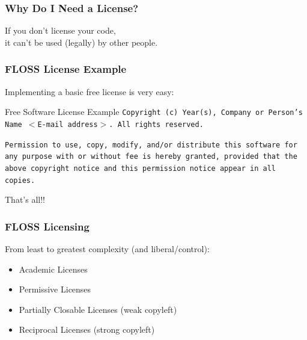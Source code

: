 \documentclass{beamer}
\begin{document}


\begin{frame}
\frametitle{Why Do I Need a License?}

\pause

\begin{center}
\Large{If you don't license your code,\\ it can't be used (legally) by other people.}
\end{center}

\end{frame}




\begin{frame}
\frametitle{FLOSS License Example}

Implementing a basic free license is very easy: 
\small
\begin{block}{Free Software License Example}
\texttt{Copyright (c) Year(s), Company or Person's Name $<$E-mail address$>$. All rights reserved.}

\medskip

\texttt{Permission to \alert{use}, \alert{copy}, \alert{modify}, and/or \alert{distribute} this software \alert{for any purpose} with or without fee is hereby granted, provided that the above copyright notice and this permission notice appear in all copies.}
\end{block}
\normalsize
\alert{That's all!!}

\end{frame}



\begin{frame}
\frametitle{FLOSS Licensing}

From least to greatest complexity (and liberal/control):
\begin{itemize}
\item \alert{Academic Licenses}
\item \alert{Permissive Licenses}
\item \alert{Partially Closable Licenses} (weak copyleft)
\item \alert{Reciprocal Licenses} (strong copyleft)
\end{itemize}

\end{frame}
\end{document}
